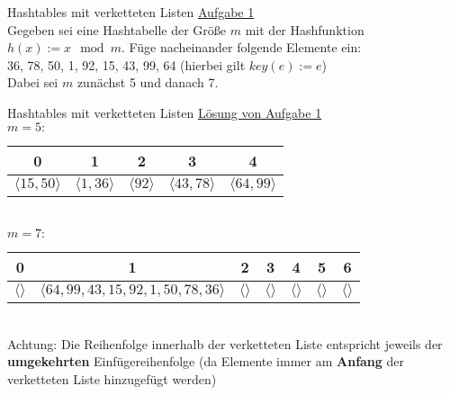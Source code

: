 \begin{frame}{Hashtables mit verketteten Listen}
	\underline{Aufgabe 1} \\
	Gegeben sei eine Hashtabelle der Größe $m$ mit der Hashfunktion $h(x) := x \mod m$. Füge nacheinander folgende Elemente ein: \\ 
	36, 78, 50, 1, 92, 15, 43, 99, 64 \quad  (hierbei gilt $key(e) := e$) \\
	Dabei sei $m$ zunächst 5 und danach 7.
\end{frame}

\begin{frame}{Hashtables mit verketteten Listen}
	\underline{Lösung von Aufgabe 1} \\[0,64cm]
	$m = 5:$
	\begin{tabular}{ | c | c | c | c | c | }
		\hline
		0 & 1 & 2 & 3 & 4
		\\ \hline
		$\langle 15, 50 \rangle$ & $\langle 1,36 \rangle$ & $\langle 92 \rangle$ & $\langle 43,78 \rangle$ & $\langle 64,99 \rangle$
		\\ \hline
	\end{tabular}
	\\[0,64cm]
	$m = 7:$
	\begin{tabular}{ | c | c | c | c | c | c | c |}
		\hline
		0 & 1 & 2 & 3 & 4 & 5 & 6
		\\ \hline
		$\langle  \rangle$ & $\langle 64, 99, 43, 15, 92, 1, 50, 78, 36 \rangle$ & $\langle  \rangle$ & $\langle  \rangle$ & $\langle  \rangle$ & $\langle  \rangle$ & $\langle  \rangle$
		\\ \hline
	\end{tabular}
	\\[0,5cm]
	Achtung: Die Reihenfolge innerhalb der verketteten Liste entspricht jeweils der \textbf{umgekehrten} Einfügereihenfolge (da Elemente immer am \textbf{Anfang} der verketteten Liste hinzugefügt werden) 
\end{frame}


